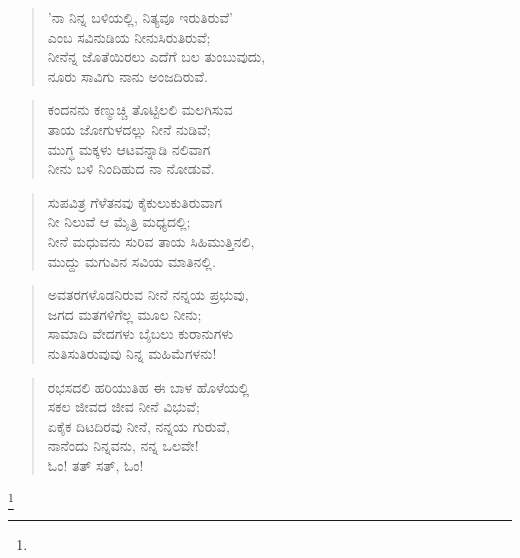 \begin{verse}
'ನಾ ನಿನ್ನ ಬಳಿಯಲ್ಲಿ, ನಿತ್ಯವೂ ಇರುತಿರುವೆ'\\ಎಂಬ ಸವಿನುಡಿಯ ನೀನುಸಿರುತಿರುವೆ;\\ನೀನೆನ್ನ ಜೊತೆಯಿರಲು ಎದೆಗೆ ಬಲ ತುಂಬುವುದು,\\ನೂರು ಸಾವಿಗು ನಾನು ಅಂಜದಿರುವೆ.
\end{verse}

\begin{verse}
ಕಂದನನು ಕಣ್ಮುಚ್ಚಿ ತೊಟ್ಟಿಲಲಿ ಮಲಗಿಸುವ\\ತಾಯ ಜೋಗುಳದಲ್ಲು ನೀನೆ ನುಡಿವೆ; \\ಮುಗ್ಧ ಮಕ್ಕಳು ಆಟವನ್ನಾಡಿ ನಲಿವಾಗ\\ನೀನು ಬಳಿ ನಿಂದಿಹುದ ನಾ ನೋಡುವೆ.
\end{verse}

\begin{verse}
ಸುಪವಿತ್ರ ಗೆಳೆತನವು ಕೈಕುಲುಕುತಿರುವಾಗ\\ನೀ ನಿಲುವೆ ಆ ಮೈತ್ರಿ ಮಧ್ಯದಲ್ಲಿ;\\ನೀನೆ ಮಧುವನು ಸುರಿವ ತಾಯ ಸಿಹಿಮುತ್ತಿನಲಿ,\\ಮುದ್ದು ಮಗುವಿನ ಸವಿಯ ಮಾತಿನಲ್ಲಿ.
\end{verse}

\begin{verse}
ಅವತರಗಳೊಡನಿರುವ ನೀನೆ ನನ್ನಯ ಪ್ರಭುವು,\\ಜಗದ ಮತಗಳಿಗೆಲ್ಲ ಮೂಲ ನೀನು;\\ಸಾಮಾದಿ ವೇದಗಳು ಬೈಬಲು ಕುರಾನುಗಳು\\ನುತಿಸುತಿರುವುವು ನಿನ್ನ ಮಹಿಮೆಗಳನು! 
\end{verse}

\begin{verse}
ರಭಸದಲಿ ಹರಿಯುತಿಹ ಈ ಬಾಳ ಹೊಳೆಯಲ್ಲಿ\\ಸಕಲ ಜೀವದ ಜೀವ ನೀನೆ ವಿಭುವೆ;\\ಏಕೈಕ ದಿಟದಿರವು ನೀನೆ, ನನ್ನಯ ಗುರುವೆ,\\ನಾನೆಂದು ನಿನ್ನವನು, ನನ್ನ ಒಲವೇ!\\ಓಂ! ತತ್ ಸತ್, ಓಂ!
\end{verse}

\protect\footnote{}

\begin{verse}
\end{verse}

